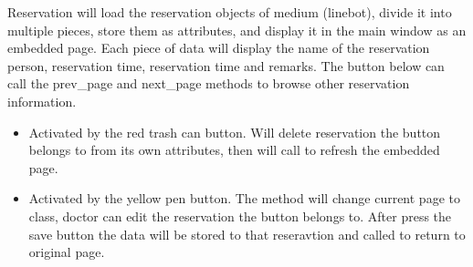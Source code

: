 \documentclass{article}
\begin{document}
Reservation will load the reservation objects of medium (linebot), 
divide it into multiple pieces, store them as attributes, and 
display it in the main window as an embedded page. Each piece of 
data will display the name of the reservation person, reservation 
time, reservation time and remarks. The button below can call the 
prev\_page and next\_page methods to browse other reservation 
information.

\begin{itemize}
  \item {} Activated by the red trash can button. Will delete reservation the button belongs to from its own attributes, then will call  to refresh the embedded page.
  \item {} Activated by the yellow pen button. The method will change current page to  class, doctor can edit the reservation the button belongs to. After press the save button the data will be stored to that reseravtion and called  to return to original page.
\end{itemize}
\end{document}
